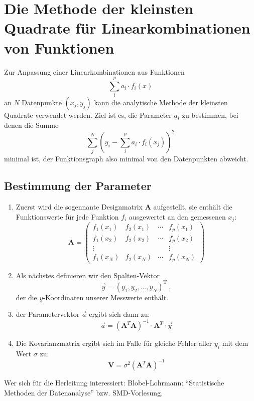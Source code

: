 \documentclass{scrartcl}
\begin{document}
\section*{Die Methode der kleinsten Quadrate für Linearkombinationen von Funktionen}

Zur Anpassung einer Linearkombinationen aus Funktionen 
\begin{equation}
    \sum_i^p a_i \cdot f_i(x)
\end{equation}
an $N$ Datenpunkte $(x_j, y_j)$ kann die analytische Methode der kleinsten Quadrate verwendet werden. 
Ziel ist es, die Parameter $a_i$ zu bestimmen, bei denen die Summe
\begin{equation}
    \sum_j^N\left( y_i - \sum_i^p a_i\cdot f_i(x_j)\right)^2
\end{equation}
minimal ist, der Funktionsgraph also minimal von den Datenpunkten abweicht.
\subsection*{Bestimmung der Parameter}

\begin{enumerate}
    \item Zuerst wird die sogennante Designmatrix $\mathbf{A}$ aufgestellt, sie enthält die Funktionswerte für jede Funktion $f_i$ ausgewertet an den gemessenen $x_j$:
        \begin{equation}
            \mathbf{A} = 
            \begin{pmatrix}
                f_1(x_1) & f_2(x_1) & \cdots & f_p(x_1) \\  
                f_1(x_2) & f_2(x_2) & \cdots & f_p(x_2) \\  
                \vdots   &          &        &  \vdots  \\
                f_1(x_N) & f_2(x_N) & \cdots & f_p(x_N) 
            \end{pmatrix}
        \end{equation}
    \item Als nächstes definieren wir den Spalten-Vektor 
        \begin{equation}
            \vec{y} = (y_1, y_2, …, y_N)^\mathrm{T} \ ,
        \end{equation}
        der die $y$-Koordinaten unserer Messwerte enthält.
    \item der Parametervektor $\vec{a}$ ergibt sich dann zu:
        \begin{equation}
            \vec{a} = \left(\mathbf{A}^T \mathbf{A}\right)^{-1} \cdot \mathbf{A}^T \cdot \vec{y}
        \end{equation}

    \item Die Kovarianzmatrix ergibt sich im Falle für gleiche Fehler aller $y_i$ mit dem Wert $\sigma$ zu:
        \begin{equation}
            \mathbf{V} = \sigma^2 \left(\mathbf{A}^T \mathbf{A}\right)^{-1}
        \end{equation}
\end{enumerate}
Wer sich für die Herleitung interessiert: Blobel-Lohrmann: \enquote{Statistische Methoden der Datenanalyse} bzw. SMD-Vorlesung.
\end{document}
